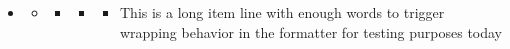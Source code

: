 \documentclass{article}
\begin{document}
\begin{itemize}
        \item
                \begin{itemize}
                        \item
                                \begin{itemize}
                                        \item
                                                \begin{itemize}
                                                        \item
                                                                \begin{itemize}
                                                                        \item
                                                                                This is a long item line with enough words to trigger wrapping behavior in the formatter for testing purposes today
                                                                \end{itemize}
                                                \end{itemize}
                                \end{itemize}
                \end{itemize}
\end{itemize}
\end{document}
